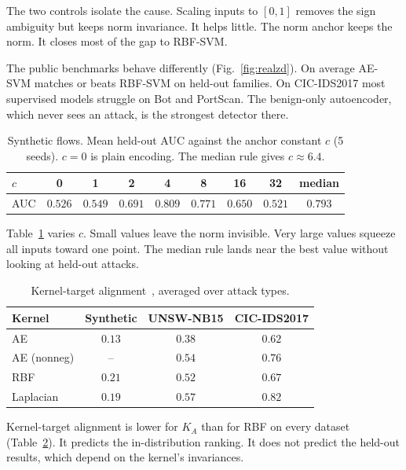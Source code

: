 \documentclass[conference,10pt]{IEEEtran}
\begin{document}
The two controls isolate the cause. Scaling inputs to $[0,1]$ removes the sign
ambiguity but keeps norm invariance. It helps little. The norm anchor keeps the
norm. It closes most of the gap to RBF-SVM.

The public benchmarks behave differently (Fig.~\ref{fig:realzd}). On average
AE-SVM matches or beats RBF-SVM on held-out families. On CIC-IDS2017 most
supervised models struggle on Bot and PortScan. The benign-only autoencoder, which
never sees an attack, is the strongest detector there.

\begin{table}[t]
  \centering
  \caption{Synthetic flows. Mean held-out AUC against the anchor constant $c$ (5 seeds). $c=0$ is plain encoding. The median rule gives $c\approx6.4$.}
  \label{tab:sweep}
  \footnotesize
  \setlength{\tabcolsep}{3.5pt}
  \begin{tabular}{lcccccccc}
    \toprule
    $c$ & 0 & 1 & 2 & 4 & 8 & 16 & 32 & median \\
    \midrule
    AUC & $0.526$ & $0.549$ & $0.691$ & $0.809$ & $0.771$ & $0.650$ & $0.521$ & $0.793$ \\
    \bottomrule
  \end{tabular}
\end{table}

Table~\ref{tab:sweep} varies $c$. Small values leave the norm invisible. Very
large values squeeze all inputs toward one point. The median rule lands near the
best value without looking at held-out attacks.

\begin{table}[t]
  \centering
  \caption{Kernel-target alignment~\cite{cristianini2002kernel}, averaged over attack types.}
  \label{tab:align}
  \footnotesize
  \begin{tabular}{lccc}
    \toprule
    Kernel & Synthetic & UNSW-NB15 & CIC-IDS2017 \\
    \midrule
    AE & $0.13$ & $0.38$ & $0.62$ \\
    AE (nonneg) & -- & $0.54$ & $0.76$ \\
    RBF & $0.21$ & $0.52$ & $0.67$ \\
    Laplacian & $0.19$ & $0.57$ & $0.82$ \\
    \bottomrule
  \end{tabular}
\end{table}

Kernel-target alignment is lower for $K_A$ than for RBF on every dataset
(Table~\ref{tab:align}). It predicts the in-distribution ranking. It does not
predict the held-out results, which depend on the kernel's invariances.
\end{document}
